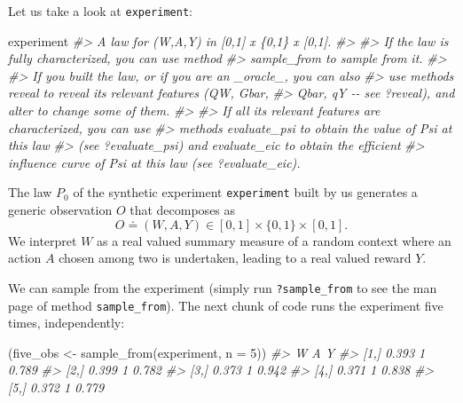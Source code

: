 \documentclass[
  11pt,
  openright,twoside]{book}
\newenvironment{Shaded}{\begin{snugshade}}{\end{snugshade}}
\newcommand{\AttributeTok}[1]{\textcolor[rgb]{0.77,0.63,0.00}{#1}}
\newcommand{\CommentTok}[1]{\textcolor[rgb]{0.56,0.35,0.01}{\textit{#1}}}
\newcommand{\DecValTok}[1]{\textcolor[rgb]{0.00,0.00,0.81}{#1}}
\newcommand{\FunctionTok}[1]{\textcolor[rgb]{0.00,0.00,0.00}{#1}}
\newcommand{\NormalTok}[1]{#1}
\newcommand{\OtherTok}[1]{\textcolor[rgb]{0.56,0.35,0.01}{#1}}
\newcommand{\defq}{\doteq}
\theoremstyle{definition}
\theoremstyle{definition}
\theoremstyle{definition}
\theoremstyle{definition}
\theoremstyle{remark}
\begin{document}
Let us take a look at \texttt{experiment}:

\begin{Shaded}
\begin{Highlighting}[]
\NormalTok{experiment}
\CommentTok{\#\textgreater{} A law for (W,A,Y) in [0,1] x \{0,1\} x [0,1].}
\CommentTok{\#\textgreater{} }
\CommentTok{\#\textgreater{} If the law is fully characterized, you can use method}
\CommentTok{\#\textgreater{} \textquotesingle{}sample\_from\textquotesingle{} to sample from it.}
\CommentTok{\#\textgreater{} }
\CommentTok{\#\textgreater{} If you built the law, or if you are an \_oracle\_, you can also}
\CommentTok{\#\textgreater{} use methods \textquotesingle{}reveal\textquotesingle{} to reveal its relevant features (QW, Gbar,}
\CommentTok{\#\textgreater{} Qbar, qY {-}{-} see \textquotesingle{}?reveal\textquotesingle{}), and \textquotesingle{}alter\textquotesingle{} to change some of them.}
\CommentTok{\#\textgreater{} }
\CommentTok{\#\textgreater{} If all its relevant features are characterized, you can use}
\CommentTok{\#\textgreater{} methods \textquotesingle{}evaluate\_psi\textquotesingle{} to obtain the value of \textquotesingle{}Psi\textquotesingle{} at this law}
\CommentTok{\#\textgreater{} (see \textquotesingle{}?evaluate\_psi\textquotesingle{}) and \textquotesingle{}evaluate\_eic\textquotesingle{} to obtain the efficient}
\CommentTok{\#\textgreater{} influence curve of \textquotesingle{}Psi\textquotesingle{} at this law (see \textquotesingle{}?evaluate\_eic\textquotesingle{}).}
\end{Highlighting}
\end{Shaded}

The law \(P_{0}\) of the synthetic experiment \texttt{experiment} built by us generates
a generic observation \(O\) that decomposes as \begin{equation*} O \defq (W, A,
Y) \in [0,1] \times \{0,1\} \times [0,1].  \end{equation*} We interpret \(W\) as
a real valued summary measure of a random context where an action \(A\) chosen
among two is undertaken, leading to a real valued reward \(Y\).

We can sample from the experiment (simply run \texttt{?sample\_from} to see the man
page of method \texttt{sample\_from}). The next chunk of code runs the experiment five
times, independently:

\begin{Shaded}
\begin{Highlighting}[]
\NormalTok{(five\_obs }\OtherTok{\textless{}{-}} \FunctionTok{sample\_from}\NormalTok{(experiment, }\AttributeTok{n =} \DecValTok{5}\NormalTok{))}
\CommentTok{\#\textgreater{}          W A     Y}
\CommentTok{\#\textgreater{} [1,] 0.393 1 0.789}
\CommentTok{\#\textgreater{} [2,] 0.399 1 0.782}
\CommentTok{\#\textgreater{} [3,] 0.373 1 0.942}
\CommentTok{\#\textgreater{} [4,] 0.371 1 0.838}
\CommentTok{\#\textgreater{} [5,] 0.372 1 0.779}
\end{Highlighting}
\end{Shaded}
\end{document}
